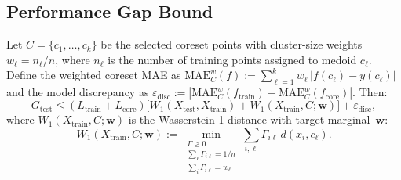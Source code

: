 \documentclass[journal]{IEEEtran}
\newcommand{\MAE}{\mathrm{MAE}}
\newcommand{\Wone}{W_1}
\newcommand{\Xtrain}{X_{\mathrm{train}}}
\newcommand{\Xtest}{X_{\mathrm{test}}}
\newcommand{\ftrain}{f_{\mathrm{train}}}
\newcommand{\fcore}{f_{\mathrm{core}}}
\newcommand{\Ltrain}{L_{\mathrm{train}}}
\newcommand{\Lcore}{L_{\mathrm{core}}}
\newcommand{\edisc}{\varepsilon_{\mathrm{disc}}}
\newcommand{\Gtest}{G_{\mathrm{test}}}
\begin{document}
\subsection{Performance Gap Bound}

\begin{theorem}\label{thm:main}
Let $C = \{c_1, \ldots, c_k\}$ be the selected coreset points
with cluster-size weights $w_\ell = n_\ell / n$, where $n_\ell$
is the number of training points assigned to medoid $c_\ell$.
Define the weighted coreset MAE as
$\MAE^w_C(f) := \sum_{\ell=1}^{k} w_\ell \, |f(c_\ell) - y(c_\ell)|$
and the model discrepancy as
$\edisc := |\MAE^w_C(\ftrain) - \MAE^w_C(\fcore)|$.
Then:
\begin{equation}\label{eq:main-bound}
\boxed{
  \Gtest \le (\Ltrain + \Lcore)
  \bigl[\Wone(\Xtest, \Xtrain) + \Wone(\Xtrain, C; \mathbf{w})\bigr]
  + \edisc,
}
\end{equation}
where $\Wone(\Xtrain, C; \mathbf{w})$ is the Wasserstein-1 distance
with target marginal~$\mathbf{w}$:
\begin{equation}\label{eq:w1w}
  \Wone(\Xtrain, C; \mathbf{w})
  := \min_{\substack{\Gamma \ge 0 \\
    \sum_\ell \Gamma_{i\ell} = 1/n \\
    \sum_i \Gamma_{i\ell} = w_\ell}}
  \sum_{i,\ell} \Gamma_{i\ell} \, d(x_i, c_\ell).
\end{equation}
\end{theorem}
\end{document}
